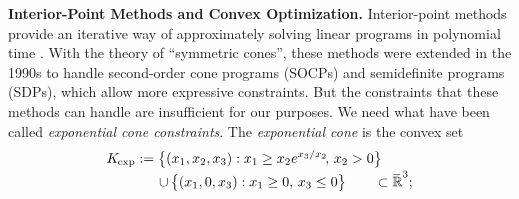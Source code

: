 \documentclass{article}
\begin{document}
%
\textbf{Interior-Point Methods and Convex Optimization.}
%
Interior-point methods provide an iterative way of approximately solving linear programs in polynomial time \parencite{karmarkar1984new}.
With the theory of ``symmetric cones'', these methods were extended in the 1990s to handle second-order cone programs (SOCPs) and semidefinite programs (SDPs), which allow more expressive constraints.
But the constraints that these methods can handle are insufficient for
our purposes. We need what have been called \emph{exponential cone constraints}.
%
The \emph{exponential cone} is the convex set
\begin{align*}
        \begin{aligned}
        K_{\mskip-1mu\exp} :=
        \big\{ (x_1, x_2, x_3) &:
                x_1 \ge x_2 e^{x_3 / x_2}\!,\, x_2 > 0 \big\}
            \\[-0.4ex]\quad \mathbin{\cup}\,
        \big\{ (x_1, 0, x_3&) : x_1 \ge 0,\, x_3 \le 0 \big\}
        \qquad \subset \mathbb {\mskip1mu\overline{\mskip-1mu\mathbb R\!}\,}^3;
    \end{aligned}
\end{align*}
\end{document}
